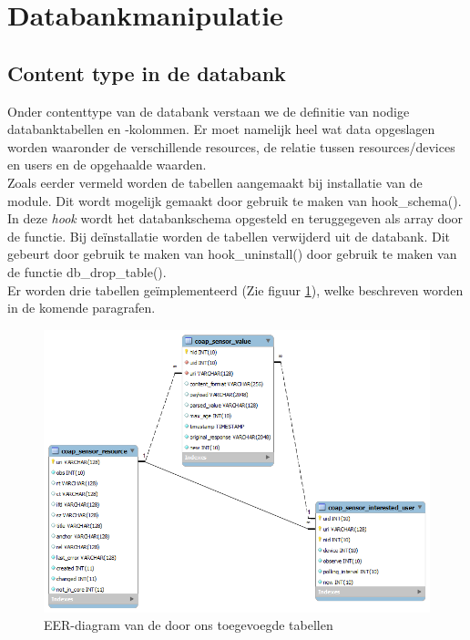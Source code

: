 \section{Databankmanipulatie}

\subsection{Content type in de databank}\label{databankSchema}
Onder contenttype van de databank verstaan we de definitie van nodige databanktabellen en -kolommen. Er moet namelijk heel wat data opgeslagen worden waaronder de verschillende resources, de relatie tussen resources/devices en users en de opgehaalde waarden.\\

Zoals eerder vermeld worden de tabellen aangemaakt bij installatie van de module. Dit wordt mogelijk gemaakt door gebruik te maken van hook\_schema(). In deze \textit{hook} wordt het databankschema opgesteld en teruggegeven als array door de functie. Bij de\"{i}nstallatie worden de tabellen verwijderd uit de databank. Dit gebeurt door gebruik te maken van hook\_uninstall() door gebruik te maken van de functie db\_drop\_table().\\

\noindent
Er worden drie tabellen ge\"{i}mplementeerd (Zie figuur \ref{fig:databankModel}), welke beschreven worden in de komende paragrafen.
\begin{figure}[h!]
\centering
\includegraphics[width=1\textwidth]{fig/databankModel}
\caption{EER-diagram van de door ons toegevoegde tabellen}
\label{fig:databankModel}
\end{figure}

